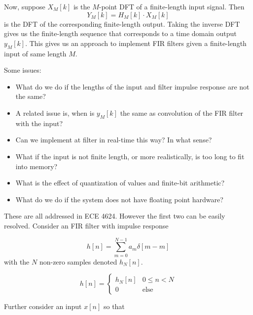 \documentclass{article}
\begin{document}
Now, suppose $X_M[k]$ is the $M$-point DFT of a finite-length input signal. Then
\[
Y_M[k] = H_M[k]\cdot X_M[k]
\]
is the DFT of the corresponding finite-length output. Taking the inverse DFT gives us the finite-length sequence that corresponds to a time domain output $y_M[k]$. This gives us an approach to implement FIR filters given a finite-length input of same length $M$.


Some issues:

\begin{itemize}
\item What do we do if the lengths of the input and filter impulse response are not the same?
\item A related issue is, when is $y_M[k]$ the same as convolution of the FIR filter with the input?
\item Can we implement at filter in real-time this way? In what sense? 
\item What if the input is not finite length, or more realistically, is too long to fit into memory?
\item What is the effect of quantization of values and finite-bit arithmetic?
\item What do we do if the system does not have floating point hardware?
\end{itemize}

These are all addressed in ECE 4624. However the first two can be easily resolved. Consider an FIR filter with impulse response

\[
h[n] = \sum\limits_{m = 0}^{N-1} a_m\delta[m-m]
\]
with the $N$ non-zero samples denoted $h_N[n]$.

\[
h[n] = \left\{ \begin{array}{cc}
h_N[n] & 0 \leq n < N\\
0 & \text{else}
\end{array}\right.
\]

Further consider an input $x[n]$ so that
\end{document}
